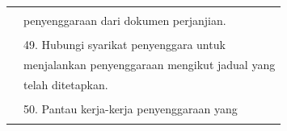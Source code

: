 \documentclass[
]{article}
\begin{document}
\begin{longtable}[]{@{}ll@{}}
\begin{minipage}[t]{0.71\columnwidth}
\end{minipage}\tabularnewline
\begin{minipage}[t]{0.23\columnwidth}\raggedright
\strut
\end{minipage} & \begin{minipage}[t]{0.71\columnwidth}\raggedright
penyenggaraan dari dokumen perjanjian.\strut
\end{minipage}\tabularnewline
\begin{minipage}[t]{0.23\columnwidth}\raggedright
\strut
\end{minipage} & \begin{minipage}[t]{0.71\columnwidth}\raggedright
\strut
\end{minipage}\tabularnewline
\begin{minipage}[t]{0.23\columnwidth}\raggedright
\strut
\end{minipage} & \begin{minipage}[t]{0.71\columnwidth}\raggedright
49. Hubungi syarikat penyenggara untuk\strut
\end{minipage}\tabularnewline
\begin{minipage}[t]{0.23\columnwidth}\raggedright
\strut
\end{minipage} & \begin{minipage}[t]{0.71\columnwidth}\raggedright
menjalankan penyenggaraan mengikut jadual yang\strut
\end{minipage}\tabularnewline
\begin{minipage}[t]{0.23\columnwidth}\raggedright
\strut
\end{minipage} & \begin{minipage}[t]{0.71\columnwidth}\raggedright
telah ditetapkan.\strut
\end{minipage}\tabularnewline
\begin{minipage}[t]{0.23\columnwidth}\raggedright
\strut
\end{minipage} & \begin{minipage}[t]{0.71\columnwidth}\raggedright
\strut
\end{minipage}\tabularnewline
\begin{minipage}[t]{0.23\columnwidth}\raggedright
\strut
\end{minipage} & \begin{minipage}[t]{0.71\columnwidth}\raggedright
50. Pantau kerja-kerja penyenggaraan yang\strut
\end{minipage}\tabularnewline
\begin{minipage}[t]{0.23\columnwidth}\raggedright
\strut
\end{minipage} & \begin{minipage}[t]{0.71\columnwidth}\raggedright

\end{minipage}
\end{longtable}
\end{document}
